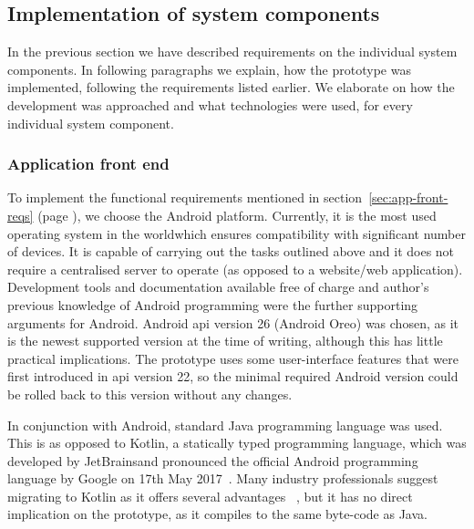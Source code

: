 \subsection{Implementation of system components}

In the previous section we have described requirements on the individual system components. In following paragraphs we explain, how the prototype was implemented, following the requirements listed earlier. We elaborate on how the development was approached and what technologies were used, for every individual system component. 
% 
% 
% 
% 
\subsubsection{Application front end} 
To implement the functional requirements mentioned in section~\ref{sec:app-front-reqs} (page \pageref{sec:app-front-reqs}), we choose the Android platform. Currently, it is the most used operating system in the world\footnotemark which ensures compatibility with significant number of devices. It is capable of carrying out the tasks outlined above and it does not require a centralised server to operate (as opposed to a website/web application). Development tools and documentation available free of charge and author's previous knowledge of Android programming were the further supporting arguments for Android. Android \acrshort{api} version 26 (Android Oreo) was chosen, as it is the newest supported version at the time of writing, although this has little practical implications. The prototype uses some user-interface features that were first introduced in \acrshort{api} version 22, so the minimal required Android version could be rolled back to this version without any changes.
% 

In conjunction with Android, standard Java programming language was used. This is as opposed to Kotlin, a statically typed programming language, which was developed by JetBrains\footnotemark and pronounced the official Android programming language by Google on 17th May 2017~\cite{Vasic2017MasteringKotlin}. 
% 
% 
Many industry professionals suggest migrating to Kotlin as it offers several advantages~\cite{Vasic2017MasteringKotlin} \footnotemark, but it has no direct implication on the prototype, as it compiles to the same byte-code as Java.
% 

